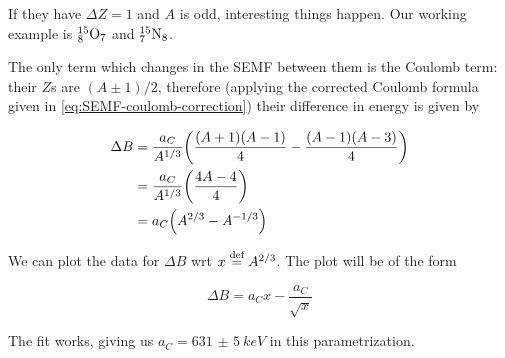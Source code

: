 \documentclass{article}
\begin{document}
If they have \(\Delta Z = 1\) and \(A\) is odd, interesting things happen. Our working example is \(^{15} _{8   } \ce{O} _{7} \) and \(^{15} _{7} \ce{N}_8 \).

The only term which changes in the SEMF between them is the Coulomb term: their \(Z\)s are \((A \pm 1)/2\), therefore (applying the corrected Coulomb formula given in \eqref{eq:SEMF-coulomb-correction}) their difference in energy is given by

\begin{subequations}
\begin{align}
  \Delta B  &= \frac{a_C}{A^{1/3}} \qty(\frac{(A+1)(A-1)}{4} - \frac{(A-1)(A-3)}{4})  \\
  &= \frac{a_C}{A^{1/3}} \qty(\frac{4A -4}{4})  \\
  &= a_C \qty(A^{2/3} - A^{-1/3})
\end{align}
\end{subequations}

We can plot the data for \(\Delta B\) wrt \(x \stackrel{\text{def}}{=} A^{2/3}\). The plot will be of the form

\begin{equation}
    \Delta B  = a_C x - \frac{a_C}{\sqrt{x}}
\end{equation}

The fit works, giving us \(a_C = \SI{631(5)}{keV}\) in this parametrization.
\end{document}
